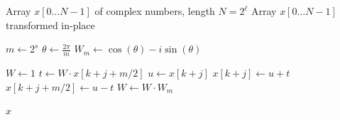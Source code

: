 \documentclass{article}
\begin{document}
\begin{algorithm}[H]
\caption{Iterative Radix-2 FFT}
\begin{algorithmic}[1]
\Require Array $x[0 \dots N-1]$ of complex numbers, length $N = 2^\ell$
\Ensure Array $x[0 \dots N-1]$ transformed in-place


\State {}

    \State $m \gets 2^s$ 
    \State $\theta \gets \frac{2\pi}{m}$
    \State $W_m \gets \cos(\theta) - i\sin(\theta)$ 
        
            \State $W \gets 1$
                \State $t \gets W \cdot x[k + j + m/2]$
                \State $u \gets x[k + j]$
                \State $x[k + j] \gets u + t$ 
                \State $x[k + j + m/2] \gets u - t$ 
                \State $W \gets W \cdot W_m$ 
                \EndFor
        \EndFor
    \EndFor

    \State \Return $x$
\EndProcedure
\end{algorithmic}
\end{algorithm}
\end{document}
